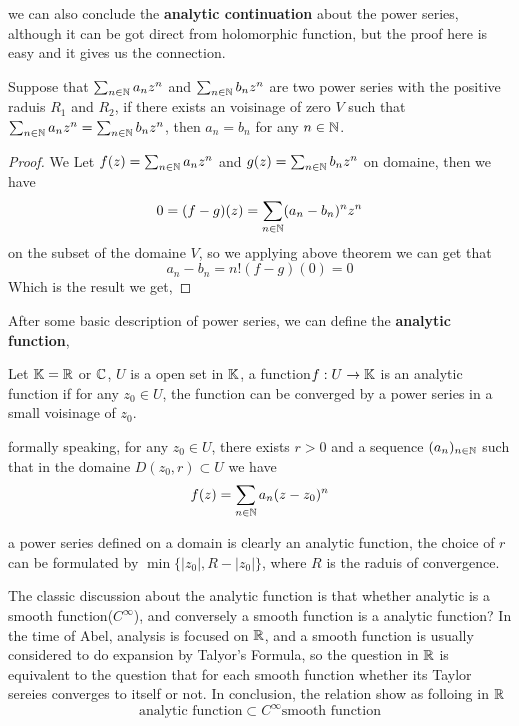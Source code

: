 \documentclass[en,geye,blue,pc,12pt]{elegantnote}
\begin{document}
we can also conclude the \textbf{analytic continuation} about the power series, although it can be got direct from holomorphic function, but the proof here is easy and it gives us the connection.
\begin{corollary}
    Suppose that \(\sum_{n \in \mathbb{N}}a_nz^n\) and  \(\sum_{n \in \mathbb{N}}b_nz^n\) are two power series with the positive raduis \(R_1\) and \(R_2\), if there exists an voisinage of zero \(V\) such that \(\sum_{n \in \mathbb{N}}a_nz^n = \sum_{n \in \mathbb{N}}b_nz^n\), then \(a_n = b_n\) for any \(n \in \mathbb{N}\). 

    \begin{proof}
        We Let \(f(z) = \sum_{n \in \mathbb{N}}a_nz^n\) and \(g(z) = \sum_{n \in \mathbb{N}}b_nz^n\) on domaine, then we have 
        \[0 = (f-g)(z) = \sum_{n \in \mathbb{N}} (a_n-b_n)^nz^n\]
        on the subset of the domaine \(V\), so we applying above theorem we can get that \[a_n-b_n = n!(f-g)(0) = 0\] Which is the result we get,
    \end{proof}
\end{corollary}

After some basic description of power series, we can define the \textbf{analytic function}, 
\begin{definition}
    Let \(\mathbb{K} = \mathbb{R}\) or \(\mathbb{C}\), \(U\) is a open set in \(\mathbb{K}\), a function\(f: U \to \mathbb{K}\) is an analytic function if for any \(z_0 \in U\), the function can be converged by a power series in a small voisinage of \(z_0\).

    formally speaking, for any \(z_0 \in U\), there exists \(r > 0\) and a sequence \((a_n)_{n \in \mathbb{N}}\) such that in the domaine \(D(z_0,r) \subset U\) we have
    \[f(z) = \sum_{n \in \mathbb{N}} a_n(z-z_0)^n\]
\end{definition}

\begin{remark}
    a power series defined on a domain is clearly an analytic function, the choice of \(r\) can be formulated by \(\min\{|z_0|,R-|z_0|\}\), where \(R\) is the raduis of convergence.
\end{remark}

The classic discussion about the analytic function is that whether  analytic is a smooth function(\(C^{\infty}\)), and conversely a smooth function is a analytic function? In the time of Abel, analysis is focused on \(\mathbb{R}\), and a smooth function is usually considered to do expansion by Talyor's Formula, so the question in \(\mathbb{R}\) is equivalent to the question that for each smooth function whether its Taylor sereies converges to itself or not. In conclusion, the relation show as folloing in \(\mathbb{R}\)
\[ \text{analytic function} \subset C^{\infty} \text{smooth function}\]
\end{document}
